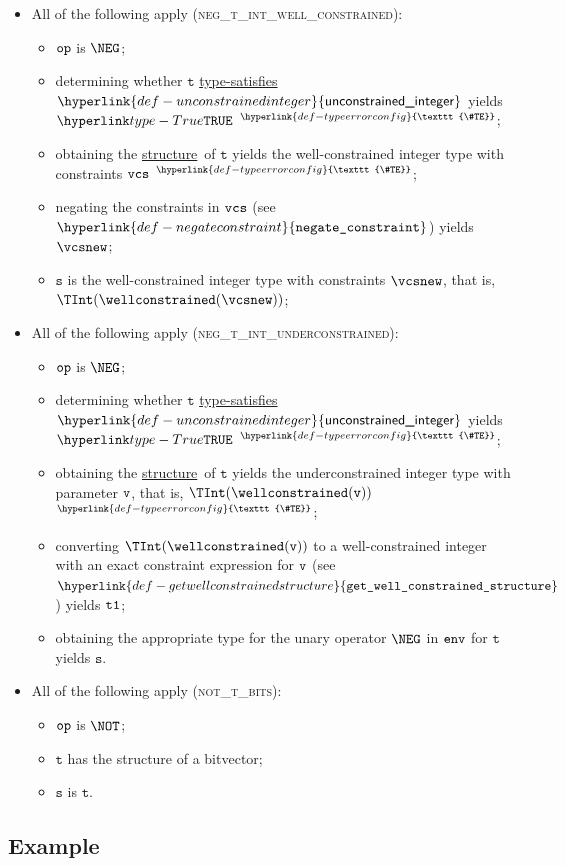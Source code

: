\documentclass{book}
\newcommand\TypeErrorConfig[0]{\hyperlink{def-typeerrorconfig}{\texttt{\#TE}}}
\newcommand\ProseOrTypeError[0]{\hyperlink{def-proseortypeerror}{$^{\TypeErrorConfig}$}}
\newcommand\unconstrainedinteger[0]{\hyperlink{def-unconstrainedinteger}{\textsf{unconstrained\_integer}}}
\newcommand\negateconstraint[0]{\hyperlink{def-negateconstraint}{\texttt{negate\_constraint}}}
\newcommand\getwellconstrainedstructure[0]{\hyperlink{def-getwellconstrainedstructure}{\texttt{get\_well\_constrained\_structure}}}
\newcommand\structure[0]{\hyperlink{def-structure}{structure}}
\newcommand\typesatisfies[0]{\hyperlink{def-typesatisfies}{type-satisfies}}
\newcommand\vt[0]{\texttt{t}}
\newcommand\vs[0]{\texttt{s}}
\begin{document}
\begin{itemize}
\item All of the following apply (\textsc{neg\_t\_int\_well\_constrained}):
\begin{itemize}
  \item $\texttt{op}$ is $\NEG$;
  \item determining whether $\vt$ \typesatisfies\ $\unconstrainedinteger$ yields $\True$ \ProseOrTypeError;
  \item obtaining the \structure\ of $\vt$ yields the well-constrained integer type with constraints $\texttt{vcs}$ \ProseOrTypeError;
  \item negating the constraints in $\texttt{vcs}$ (see $\negateconstraint$) yields $\vcsnew$;
  \item $\vs$ is the well-constrained integer type with constraints $\vcsnew$, that is, \\
  $\TInt(\wellconstrained(\vcsnew))$;
\end{itemize}

\item All of the following apply (\textsc{neg\_t\_int\_underconstrained}):
\begin{itemize}
  \item $\texttt{op}$ is $\NEG$;
  \item determining whether $\vt$ \typesatisfies\ $\unconstrainedinteger$ yields $\True$ \ProseOrTypeError;
  \item obtaining the \structure\ of $\vt$ yields the underconstrained integer type with parameter $\texttt{v}$, that is,
  $\TInt(\wellconstrained(\vv))$ \ProseOrTypeError;
  \item converting $\TInt(\wellconstrained(\vv))$ to a well-constrained integer with an exact constraint expression for $\texttt{v}$
  (see $\getwellconstrainedstructure$) yields $\texttt{t1}$;
  \item obtaining the appropriate type for the unary operator $\NEG$ in $\texttt{env}$ for $\vt$ yields $\vs$.
\end{itemize}

\item All of the following apply (\textsc{not\_t\_bits}):
  \begin{itemize}
  \item $\texttt{op}$ is $\NOT$;
  \item $\vt$ has the structure of a bitvector;
  \item $\vs$ is $\vt$.
  \end{itemize}
\end{itemize}

\subsection{Example}
\end{document}
